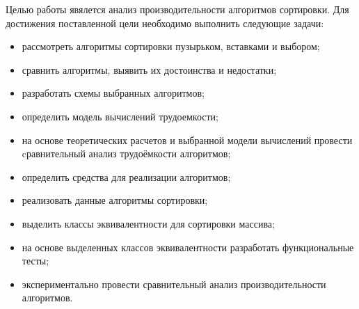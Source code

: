 Целью работы явялется анализ производительности алгоритмов сортировки. Для достижения поставленной 
цели необходимо выполнить следующие задачи:
\begin{itemize}
	\item рассмотреть алгоритмы сортировки пузырьком, вставками и выбором;
	\item сравнить алгоритмы, выявить их достоинства и недостатки;
	\item разработать схемы выбранных алгоритмов;
	\item определить модель вычислений трудоемкости;
	\item на основе теоретических расчетов и выбранной модели вычислений 
	провести cравнительный анализ трудоёмкости алгоритмов;
	\item определить средства для реализации алгоритмов;
	\item реализовать данные алгоритмы сортировки;
	\item выделить классы эквивалентности для сортировки массива;
	\item на основе выделенных классов эквивалентности разработать функциональные тесты;
	\item экспериментально провести сравнительный анализ производительности алгоритмов.
\end{itemize}




